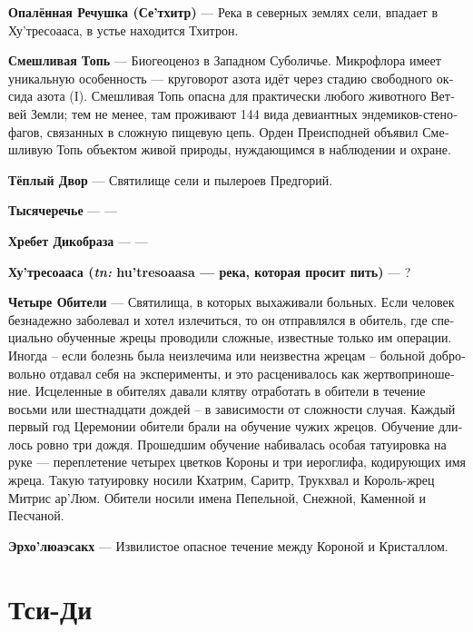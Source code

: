 \documentclass[a4paper,12pt,fleqn]{book}\usepackage{cooltooltips}\usepackage{polyglossia}\setdefaultlanguage[babelshorthands=true]{russian}\setotherlanguage{english}\defaultfontfeatures{Ligatures=TeX,Mapping=tex-text} \usepackage{xcolor}\definecolor{lightgray}{HTML}{bbbbbb}\color{lightgray}\newcommand{\ml}[3]{\textenglish{\textcolor{black}{#3}}}
\newcommand{\theterm}[3]{\textbf{\hypertarget{#1}{#2}} --- #3}
\newcommand{\theorigin}[3]{\textit{#1:} #2 --- #3}
\begin{document}
\theterm{se-tchitr}
{Опалённая Речушка (Се'тхитр)}
{Река в северных землях сели, впадает в Ху'тресоааса, в устье находится Тхитрон.}

\theterm{risible-swamp}
{Смешливая Топь}
{Биогеоценоз в Западном Суболичье.
Микрофлора имеет уникальную особенность --- круговорот азота идёт через стадию свободного оксида азота (I).
Смешливая Топь опасна для практически любого животного Ветвей Земли;
тем не менее, там проживают 144 вида девиантных эндемиков-стенофагов, связанных в сложную пищевую цепь.
Орден Преисподней объявил Смешливую Топь объектом живой природы, нуждающимся в наблюдении и охране.}

\theterm{sanct2}
{Тёплый Двор}
{Святилище сели и пылероев Предгорий.}

\theterm{rivertangle}
{Тысячеречье}
{---}

\theterm{hedgehog-spine}
{Хребет Дикобраза}
{---}

\theterm{hu-tresoaasa}
{Ху'тресоааса (\theorigin{tn}{hu'tresoaasa}{река, которая просит пить})}
{?}

\theterm{abode}
{Четыре Обители}
{Святилища, в которых выхаживали больных.
Если человек безнадежно заболевал и хотел излечиться, то он отправлялся в обитель, где специально обученные жрецы проводили сложные, известные только им операции.
Иногда -- если болезнь была неизлечима или неизвестна жрецам -- больной добровольно отдавал себя на эксперименты, и это расценивалось как жертвоприношение.
Исцеленные в обителях давали клятву отработать в обители в течение восьми или шестнадцати дождей -- в зависимости от сложности случая.
Каждый первый год Церемонии обители брали на обучение чужих жрецов.
Обучение длилось ровно три дождя.
Прошедшим обучение набивалась особая татуировка на руке --- переплетение четырех цветков Короны и три иероглифа, кодирующих имя жреца.
Такую татуировку носили Кхатрим, Саритр, Трукхвал и Король-жрец Митрис ар'Люм.
Обители носили имена Пепельной, Снежной, Каменной и Песчаной.}

\theterm{oerho-loeaesakch}
{Эрхо'люаэсакх}
{Извилистое опасное течение между Короной и Кристаллом.}

\section{Тси-Ди}
\end{document}
